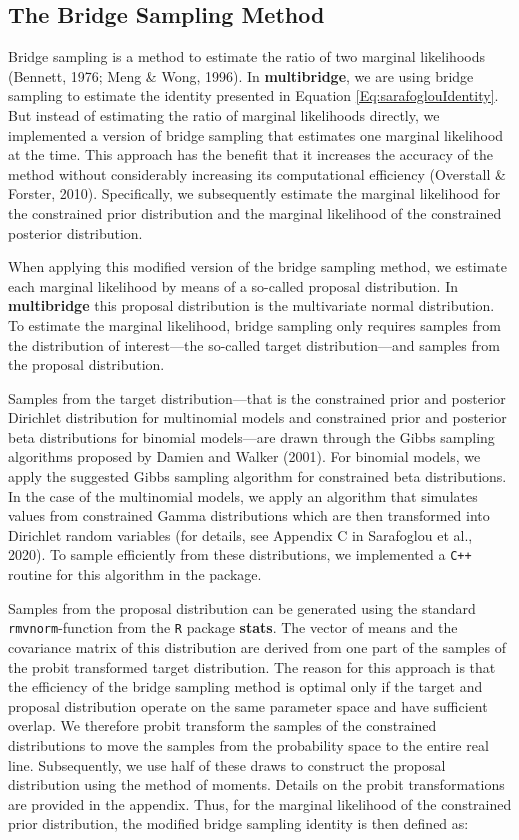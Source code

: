 \documentclass[
  english,
  man,floatsintext]{apa6}
\begin{document}
\hypertarget{the-bridge-sampling-method}{%
\subsection{The Bridge Sampling Method}\label{the-bridge-sampling-method}}

Bridge sampling is a method to estimate the ratio of two marginal likelihoods (Bennett, 1976; Meng \& Wong, 1996). In \textbf{multibridge}, we are using bridge sampling to estimate the identity presented in Equation \ref{Eq:sarafoglouIdentity}. But instead of estimating the ratio of marginal likelihoods directly, we implemented a version of bridge sampling that estimates one marginal likelihood at the time. This approach has the benefit that it increases the accuracy of the method without considerably increasing its computational efficiency (Overstall \& Forster, 2010). Specifically, we subsequently estimate the marginal likelihood for the constrained prior distribution and the marginal likelihood of the constrained posterior distribution.

When applying this modified version of the bridge sampling method, we estimate each marginal likelihood by means of a so-called proposal distribution. In \textbf{multibridge} this proposal distribution is the multivariate normal distribution. To estimate the marginal likelihood, bridge sampling only requires samples from the distribution of interest---the so-called target distribution---and samples from the proposal distribution.

Samples from the target distribution---that is the constrained prior and posterior Dirichlet distribution for multinomial models and constrained prior and posterior beta distributions for binomial models---are drawn through the Gibbs sampling algorithms proposed by Damien and Walker (2001). For binomial models, we apply the suggested Gibbs sampling algorithm for constrained beta distributions. In the case of the multinomial models, we apply an algorithm that simulates values from constrained Gamma distributions which are then transformed into Dirichlet random variables (for details, see Appendix C in Sarafoglou et al., 2020). To sample efficiently from these distributions, we implemented a \texttt{C++} routine for this algorithm in the package.

Samples from the proposal distribution can be generated using the standard \texttt{rmvnorm}-function from the \texttt{R} package \textbf{stats}. The vector of means and the covariance matrix of this distribution are derived from one part of the samples of the probit transformed target distribution. The reason for this approach is that the efficiency of the bridge sampling method is optimal only if the target and proposal distribution operate on the same parameter space and have sufficient overlap. We therefore probit transform the samples of the constrained distributions to move the samples from the probability space to the entire real line. Subsequently, we use half of these draws to construct the proposal distribution using the method of moments. Details on the probit transformations are provided in the appendix. Thus, for the marginal likelihood of the constrained prior distribution, the modified bridge sampling identity is then defined as:
\end{document}
